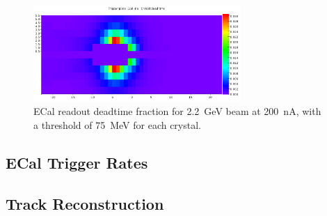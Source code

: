 \begin{figure}[ht]
	\includegraphics[width=0.7\textwidth]{performance/ecal_deadtime_22}
	\caption{\small{ECal readout deadtime fraction for 2.2~GeV beam at 200~nA, 
with a threshold of 75~MeV for each crystal.}}
	\label{fig:ecal_deadtime}
\end{figure}

\subsection{ECal Trigger Rates}
\label{sec:ecaltrigg}


%


\subsection{Track Reconstruction}




